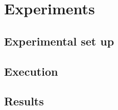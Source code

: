 \chapter{Experiments}\label{ch:Experiments}

\section{Experimental set up}

\section{Execution}

\section{Results}

